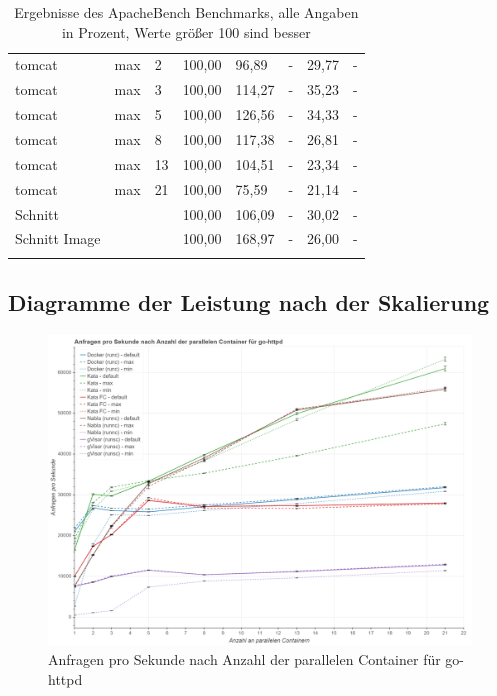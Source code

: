 \begin{footnotesize}
\begin{longtable}{llllllll}
		tomcat         & max     & 2          & 100,00 & 96,89                       & -                              & 29,77  & -      \\
		tomcat         & max     & 3          & 100,00 & 114,27                      & -                              & 35,23  & -      \\
		tomcat         & max     & 5          & 100,00 & 126,56                      & -                              & 34,33  & -      \\
		tomcat         & max     & 8          & 100,00 & 117,38                      & -                              & 26,81  & -      \\
		tomcat         & max     & 13         & 100,00 & 104,51                      & -                              & 23,34  & -      \\
		tomcat         & max     & 21         & 100,00 & 75,59                       & -                              & 21,14  & -      \\ \hline
		Schnitt        &         &            & 100,00 & 106,09                      & -                              & 30,02  & -      \\ \hline
		Schnitt Image  &         &            & 100,00 & 168,97                      & -                              & 26,00  & -      \\ \hline
\caption[Ergebnisse ApacheBench]{Ergebnisse des ApacheBench Benchmarks, \newline \footnotesize alle Angaben in Prozent,  Werte größer 100 sind besser}
\label{tbl:abdetailauswertung}
\end{longtable}
\end{footnotesize}
\newpage

\subsection{Diagramme der Leistung nach der Skalierung}

\begin{figure}[h]
	\centering
	\includegraphics[width=0.96\linewidth]{gfx/auswertung/ab_go.png}
	\caption{Anfragen pro Sekunde nach Anzahl der parallelen Container für go-httpd} 
	\label{fig:ab_go}
\end{figure}
\newpage

